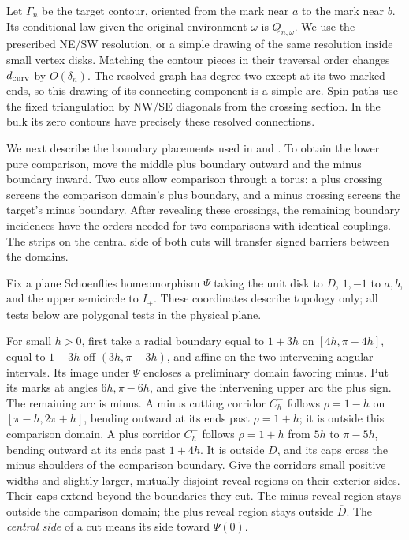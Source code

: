 Let $\Gamma_n$ be the target contour, oriented from the mark near $a$
to the mark near $b$.  Its conditional law given the original
environment $\omega$ is $Q_{n,\omega}$.  We use the prescribed NE/SW
resolution, or a simple drawing of the same resolution inside small
vertex disks.  Matching the contour pieces in their traversal order
changes $d_{\rm curv}$ by $O(\delta_n)$.  The resolved graph has degree
two except at its two marked ends, so this drawing of its connecting
component is a simple arc.  Spin paths use the fixed triangulation by
NW/SE diagonals from the crossing section.  In the bulk its zero
contours have precisely these resolved connections.

We next describe the boundary placements used in
\cite[Section~9, ``Displaced domains and finite boundary barriers'']{R}
and \cite[Section~7, ``Fixed displaced domains and their boundary
incidences'']{S}.  To obtain the lower pure comparison, move the middle
plus boundary outward and the minus boundary inward.  Two cuts allow
comparison through a torus: a plus crossing screens the comparison
domain's plus boundary, and a minus crossing screens the target's minus
boundary.  After revealing these crossings, the remaining boundary
incidences have the orders needed for two comparisons with identical
couplings.  The strips on the central side of both cuts will transfer
signed barriers between the domains.

Fix a plane Schoenflies homeomorphism $\Psi$ taking
the unit disk to $D$, $1,-1$ to $a,b$, and the upper semicircle to
$I_+$.  These coordinates describe topology only; all tests below are
polygonal tests in the physical plane.

For small $h>0$, first take a radial boundary equal to $1+3h$ on
$[4h,\pi-4h]$, equal to $1-3h$ off $(3h,\pi-3h)$, and affine on
the two intervening angular intervals.  Its image under $\Psi$
encloses a preliminary domain favoring minus.  Put its marks at angles
$6h,\pi-6h$, and give the intervening upper arc the plus sign.  The
remaining arc is minus.  A minus cutting corridor $C_h^-$ follows
$\rho=1-h$ on $[\pi-h,2\pi+h]$, bending outward at its ends past
$\rho=1+h$; it is outside this comparison domain.  A plus corridor
$C_h^+$ follows $\rho=1+h$ from $5h$ to $\pi-5h$, bending outward
at its ends past $1+4h$.  It is outside $D$, and its caps cross the
minus shoulders of the comparison boundary.  Give the corridors small
positive widths and slightly larger, mutually disjoint reveal regions
on their exterior sides.  Their caps extend beyond the boundaries they
cut.  The minus reveal region stays outside the comparison domain;
the plus reveal region stays outside $\overline D$.
The \emph{central side} of a cut means its side toward $\Psi(0)$.

